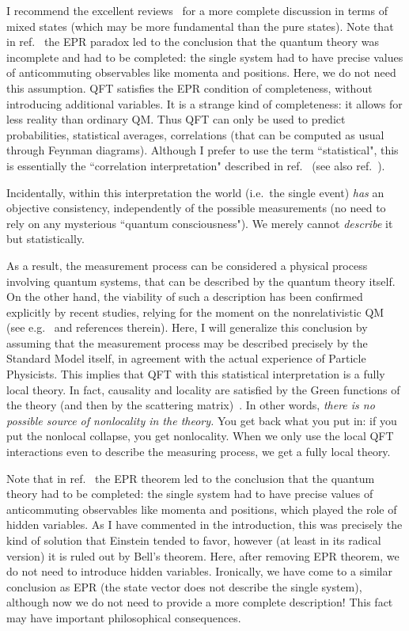 \documentclass[12pt]{article}
\begin{document}
I recommend the excellent reviews~\cite{Ballentine70,Belinfante,BJ} for a more complete discussion
in terms of mixed states (which may be more fundamental than the
pure states). Note that in ref.~\cite{Ballentine70} the EPR
paradox led to the conclusion that the quantum theory was
incomplete and had to be completed: the single system had to have
precise values of anticommuting observables like momenta and
positions. Here, we do not need this assumption. QFT satisfies the
EPR condition of completeness, without introducing additional
variables. It is a strange kind of completeness: it allows for
less reality than ordinary QM. Thus QFT can only be used to
predict probabilities, statistical averages, correlations (that
can be computed as usual through Feynman diagrams). Although I
prefer to use the term ``statistical", this is essentially the
``correlation interpretation" described in ref.~\cite{Laloe} (see
also ref.~\cite{PeresFuchs}).

Incidentally, within this interpretation the world (i.e.\ the
single event) \emph{has} an objective consistency, independently of
the possible measurements (no need to rely on any mysterious
``quantum consciousness"). We merely cannot \emph{describe} it but
statistically.

As a result, the measurement process can be considered a physical
process involving quantum systems, that can be described by the
quantum theory itself. On the other hand, the viability of such a
description has been confirmed explicitly by recent studies,
relying for the moment on the nonrelativistic QM (see e.g.~\cite{Zeno} and references therein). Here, I will generalize this
conclusion by assuming that the measurement process may be
described precisely by the Standard Model itself, in agreement
with the actual experience of Particle Physicists. This implies
that {QFT with this statistical interpretation is a fully local
theory.} In fact, causality and locality are satisfied by the
Green functions of the theory (and then by the scattering matrix)~\cite{WeinbookI,WeinbookII}. In other words, \emph{there is no
possible source of nonlocality in the theory.} You get back what
you put in: if you put the nonlocal collapse, you get nonlocality.
When we only use the local QFT interactions even to describe the
measuring process, we get a fully local theory.

Note that in ref.~\cite{Ballentine70} the EPR theorem led to the
conclusion that the quantum theory had to be completed: the single
system had to have precise values of anticommuting observables
like momenta and positions, which played the role of hidden
variables. As I have commented in the introduction, this was
precisely the kind of solution that Einstein tended to favor,
however (at least in its radical version) it is ruled out by
Bell's theorem. Here, after removing EPR theorem, we do not need
to introduce hidden variables. Ironically, we have come to a
similar conclusion as EPR (the state vector does not describe the
single system), although now we do not need to provide a more
complete description! This fact may have important philosophical
consequences.
\end{document}
